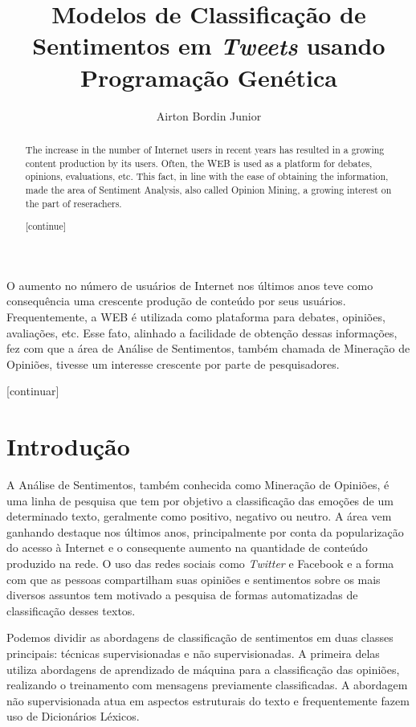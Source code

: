 \documentclass[12pt]{article}
\title{Modelos de Classificação de Sentimentos em \emph{Tweets} usando Programação Genética}
\author{Airton Bordin Junior\inst{1}}
\begin{document}
 

\maketitle

\begin{abstract}
The increase in the number of Internet users in recent years has resulted in a growing content production by its users. Often, the WEB is used as a platform for debates, opinions, evaluations, etc. This fact, in line with the ease of obtaining the information, made the area of Sentiment Analysis, also called Opinion Mining, a growing interest on the part of reserachers.

[continue]
\end{abstract}

\begin{resumo} 
O aumento no número de usuários de Internet nos últimos anos teve como consequência uma crescente produção de conteúdo por seus usuários. Frequentemente, a WEB é utilizada como plataforma para debates, opiniões, avaliações, etc. Esse fato, alinhado a facilidade de obtenção dessas informações, fez com que a área de Análise de Sentimentos, também chamada de Mineração de Opiniões, tivesse um interesse crescente por parte de pesquisadores. 

[continuar]
\end{resumo}

\section{Introdução}

A Análise de Sentimentos, também conhecida como Mineração de Opiniões, é uma linha de pesquisa que tem por objetivo a classificação das emoções de um determinado texto, geralmente como positivo, negativo ou neutro. A área vem ganhando destaque nos últimos anos, principalmente por conta da popularização do acesso à Internet e o consequente aumento na quantidade de conteúdo produzido na rede. O uso das redes sociais como \emph{Twitter} e Facebook e a forma com que as pessoas compartilham suas opiniões e sentimentos sobre os mais diversos assuntos tem motivado a pesquisa de formas automatizadas de classificação desses textos.

Podemos dividir as abordagens de classificação de sentimentos em duas classes principais: técnicas supervisionadas e não supervisionadas. A primeira delas utiliza abordagens de aprendizado de máquina para a classificação das opiniões, realizando o treinamento com mensagens previamente classificadas. A abordagem não supervisionada atua em aspectos estruturais do texto e frequentemente fazem uso de Dicionários Léxicos.
\end{document}
